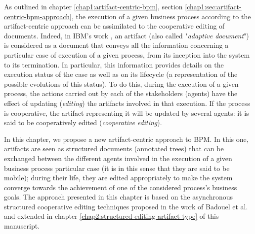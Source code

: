 \label{chap3:sec:introduction}

As outlined in chapter \ref{chap1:artifact-centric-bpm}, section \ref{chap1:sec:artifact-centric-bpm-approach}, the execution of a given business process according to the artifact-centric approach can be assimilated to the cooperative editing of documents. Indeed, in IBM's work \cite{nigam2003business}, an artifact (also called "\textit{adaptive document}") is considered as a document that conveys all the information concerning a particular case of execution of a given process, from its inception into the system to its termination. In particular, this information provides details on the execution status of the case as well as on its lifecycle (a representation of the possible evolutions of this status). 
To do this, during the execution of a given process, the actions carried out by each of the stakeholders (agents) have the effect of updating (\textit{editing}) the artifacts involved in that execution. If the process is cooperative, the artifact representing it will be updated by several agents: it is said to be cooperatively edited (\textit{cooperative editing}). 

In this chapter, we propose a new artifact-centric approach to BPM. In this one, artifacts are seen as structured documents (annotated trees) that can be exchanged between the different agents involved in the execution of a given business process particular case (it is in this sense that they are said to be mobile); during their life, they are edited appropriately to make the system converge towards the achievement of one of the considered process's business goals. The approach presented in this chapter is based on the asynchronous structured cooperative editing techniques proposed in the work of Badouel et al. \cite{badouelTchoupeCmcs, theseTchoupe, tchoupeAtemkeng2} and extended in chapter \ref{chap2:structured-editing-artifact-type} \cite{tchoupeZekeng2016, tchoupeZekeng2017, zekengTchoupe2018} of this manuscript.  

